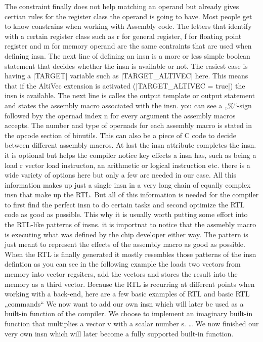 The constraint finally does not help matching an operand but already gives certian rules for the register class the operand is going to have. Most people get to know constrains when working with Assembly code. The letters that identify with a certain register class such as r for general register, f for floating point register and m for memory operand are the same contraints that are used when defining insn.
The next line of defining an insn is a more or less simple boolean statement that decides whether the insn is available or not. The easiest case is having a |TARGET| variable such as |TARGET_ALTIVEC| here. This means that if the AltiVec extension is activated (|TARGET_ALTIVEC = true|) the insn is available.
The next line is calles the output template or output statement and states the assembly macro associated with the insn. you can see a „\%“-sign followed byy the opernad index n for every argument the assembly macros accepts. The number and type of opernads for each assembly macro is stated in the opcode section of binutils. This can also be a piece of C code to decide between different assembly macros.
At last the insn attribute completes the insn. it is optional but helps the compiler notice key effects a insn has, such as being a load r vector load instructon, an arithmetic or logical instruction etc. there is a wide variety of options here but only a few are needed in our case.
All this information makes up just a single insn in a very long chain of equally complex insn that make up the RTL. But all of this information is needed for the compiler to first find the perfect insn to do certain tasks and second optimize the RTL code as good as possible. This why it is usually worth putting some effort into the RTL-like patterns of insns. it is importnat to notice that the assmebly macro is executing what was defined by the chip developer either way. The pattern is just meant to represent the effects of the assembly macro as good as possible.
When the RTL is finally generated it mostly resembles those patterns of the insn defintion as you can see in the following example the loads two vectors from memory into vector regsiters, add the vectors and stores the result into the memory as a third vector.
Because the RTL is recurring at different points when working with a back-end, here are a few basic examples of RTL and basic RTL „commands“
We now want to add our own insn which will later be used as a built-in function of the compiler. We choose to implement an imaginary built-in function that multiplies a vector v with a scalar number s.
…
We now finished our very own insn which will later become a fully supported built-in function.
